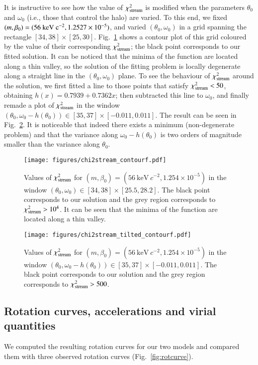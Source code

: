 \documentclass[twocolumn]{aa}
\begin{document}
It is instructive to see how the value of $\chi^2_{\rm{stream}}$ is modified when the parameters $\theta_0$ and $\omega_0$ (i.e., those that control the halo) are varied. To this end, we fixed $(m, \beta_0)=(56~\rm{keV}~c^{-2}, 1.2527\times10^{-5})$, and varied $(\theta_0, \omega_0)$ in a grid spanning the rectangle $[34, 38]\times[25, 30]$.
Fig.~\ref{fig:chi2stream} shows a contour plot of this grid coloured by the value of their corresponding $\chi^2_{\rm{stream}}$; the black point corresponds to our fitted solution.
It can be noticed that the minima of the function are located along a thin valley, so the solution of the fitting problem is locally degenerate along a straight line in the $(\theta_0, \omega_0)$ plane. 
To see the behaviour of $\chi^2_{\rm{stream}}$ around the solution, we first fitted a line to those points that satisfy $\chi^2_{\rm{stream}}<50$,
obtaining $h(x)= 0.7939+0.7362x$; then subtracted this line to $\omega_0$, and finally remade a plot of $\chi^2_{\rm{stream}}$ in the window $(\theta_0, \omega_0-h(\theta_0))\in[35, 37]\times[-0.011,0.011]$. The result can be seen in Fig.~\ref{fig:chi2stream_tilted}. It is noticeable that indeed there exists a minimum (non-degenerate problem) and that
the variance along $\omega_0-h(\theta_0)$ is two orders of magnitude smaller than the variance along $\theta_0$.
%
\begin{figure}
   \centering
   \texttt{[image: figures/chi2stream\_contourf.pdf]}
   \caption{Values of $\chi^2_{\rm{stream}}$ for $(m, \beta_0)=(56~\mathrm{keV}~c^{-2}, 1.254\times10^{-5})$ in the window $(\theta_0, \omega_0)\in[34, 38]\times[25.5,28.2]$. The black point corresponds to our solution and the grey region corresponds to $\chi^2_{\rm{stream}} >10^4$. It can be seen that the minima of the function are located along a thin valley.}
   \label{fig:chi2stream}
\end{figure}
\begin{figure}
   \centering
   \texttt{[image: figures/chi2stream\_tilted\_contourf.pdf]}
   \caption{Values of $\chi^2_{\rm{stream}}$ for $(m, \beta_0)=(56~\mathrm{keV}~c^{-2}, 1.254\times10^{-5})$ in
   the window $(\theta_0, \omega_0-h(\theta_0))\in[35, 37]\times[-0.011,0.011]$. The black point corresponds to our solution and the grey region corresponds to $\chi^2_{\rm{stream}} > 500 $. }
   \label{fig:chi2stream_tilted}
\end{figure}

\subsection{Rotation curves, accelerations and virial quantities}
We computed the resulting rotation curves for our two models and compared them with three observed rotation curves (Fig.~\ref{fig:rotcurve}). 
\end{document}
